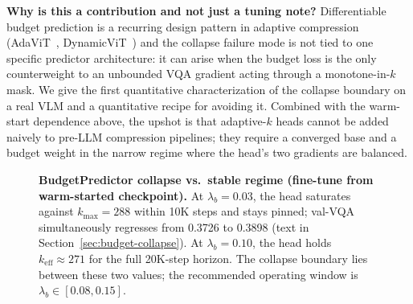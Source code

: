 \documentclass{article}
\begin{document}
\textbf{Why is this a contribution and not just a tuning note?}
Differentiable budget prediction is a recurring design pattern in
adaptive compression (AdaViT~\cite{meng2022adavit},
DynamicViT~\cite{rao2021dynamicvit}) and the collapse failure mode is
not tied to one specific predictor architecture: it can arise when
the budget loss is the only counterweight to an unbounded VQA gradient
acting through a monotone-in-$k$ mask. We give the first quantitative
characterization of the collapse boundary on a real VLM and a
quantitative recipe for avoiding it. Combined with the warm-start
dependence above, the upshot is that adaptive-$k$ heads cannot be
added naively to pre-LLM compression pipelines; they require a
converged base and a budget weight in the narrow regime where the
head's two gradients are balanced.

\begin{figure}[t]
\centering
{}
\caption{\textbf{BudgetPredictor collapse vs.\ stable regime
(fine-tune from warm-started checkpoint).}
At $\lambda_b{=}0.03$, the head saturates against $k_{\max}{=}288$
within 10K steps and stays pinned; val-VQA simultaneously regresses
from 0.3726 to 0.3898 (text in Section~\ref{sec:budget-collapse}).
At $\lambda_b{=}0.10$, the head holds $k_\text{eff}\!\approx\!271$ for
the full 20K-step horizon. The collapse boundary lies between these
two values; the recommended operating window is
$\lambda_b\!\in\![0.08,0.15]$.}
\label{fig:budget-collapse}
\end{figure}
\end{document}
